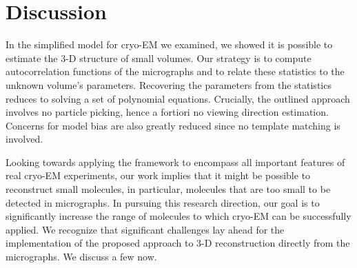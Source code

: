 \documentclass[english,11pt]{article}
\newcommand{\1}{\mathbf{1}}
\newcommand{\TODO}[1]{{\color{red}{[#1]}}}
\numberwithin{equation}{section}
\theoremstyle{plain}
\theoremstyle{definition}
\theoremstyle{remark}
\theoremstyle{plain}
\theoremstyle{remark}
\theoremstyle{plain}
\theoremstyle{plain}
\newcommand{\SNR}{\ensuremath{\textsf{SNR}}}
\begin{document}
%



\clearpage
\section{Discussion}


In the simplified model for cryo-EM we examined, we showed it is possible to estimate the 3-D structure of small volumes. 
Our strategy is to compute autocorrelation functions of the micrographs and to relate these statistics to the unknown volume's parameters. Recovering the parameters from the statistics reduces to solving a set of polynomial equations.
Crucially, the outlined approach involves no particle picking, hence a fortiori no viewing direction estimation. Concerns for model bias are also greatly reduced since no template matching is involved.

Looking towards applying the framework to encompass all important features of real cryo-EM experiments, our work implies that it might be possible to reconstruct small molecules, in particular, molecules that are too small to be detected in micrographs. 
In pursuing this research direction, our goal is to significantly increase the range of molecules to which cryo-EM can be successfully applied.
We recognize that significant challenges lay ahead for the implementation of the proposed approach to 3-D reconstruction directly from the micrographs. We discuss a few now.
\end{document}

